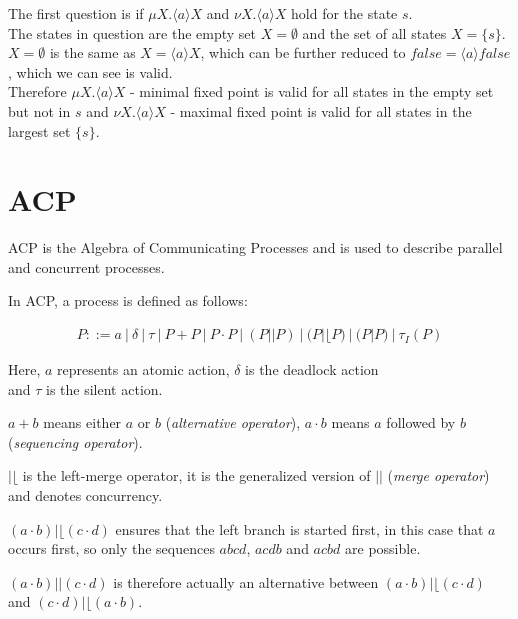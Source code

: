 \documentclass{clseminar}
\begin{document}
  \begin{example}
    The first question is if $\mu X. \langle a \rangle X$ and $\nu X. \langle a \rangle X$ hold for the state $s$. \\
    The states in question are the empty set $X = \emptyset$ and the set of all states $X = \{s\}$. \\
    $X = \emptyset$ is the same as $X = \langle a \rangle X$, which can be further reduced to $\mathit{false} = \langle a \rangle \mathit{false}$, which we can see is valid. \\
    Therefore $\mu X. \langle a \rangle X$ - minimal fixed point is valid for all states in the empty set but not in $s$ and $\nu X. \langle a \rangle X$ - maximal fixed point is valid for all states in the largest set $\{s\}$.
  \end{example}

  \section{ACP}

  ACP is the Algebra of Communicating Processes and is used to describe parallel and concurrent processes.

  In ACP, a process is defined \cite{acp_wiki} as follows:

  \begin{align*}
    P ::= a\ |\ \delta\ |\ \tau\ |\ P + P\ |\ P \cdot P\ |\ (P || P)\ |\ (P |\lfloor P)\ |\ (P | P)\ |\ \tau_I(P)
  \end{align*}

  Here, $a$ represents an atomic action, $\delta$ is the deadlock action \\ and $\tau$ is the silent action.

  $a + b$ means either $a$ or $b$ (\textit{alternative operator}), $a \cdot b$ means $a$ followed by $b$ (\textit{sequencing operator}).

  $|\lfloor$ is the left-merge operator, it is the generalized version of $||$ (\textit{merge operator}) and denotes concurrency.
  \\
  \begin{example}
    $(a \cdot b) |\lfloor (c \cdot d)$ ensures that the left branch is started first, in this case that $a$ occurs first, so only the sequences $abcd$, $acdb$ and $acbd$ are possible.

    $(a \cdot b) || (c \cdot d)$ is therefore actually an alternative between $(a \cdot b) |\lfloor (c \cdot d)$ and $(c \cdot d) |\lfloor (a \cdot b)$.
  \end{example}
\end{document}
